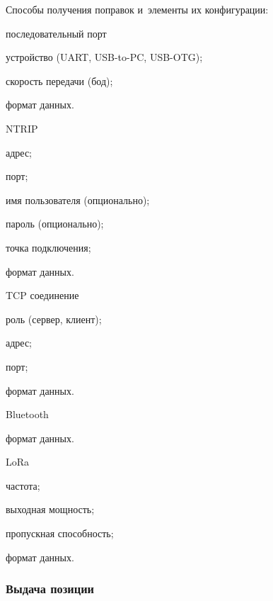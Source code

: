 Способы получения поправок и~элементы их конфигурации:
\begin{dashitemize}
  \item последовательный порт
  \begin{dashitemize}
    \item устройство (UART, USB-to-PC, USB-OTG);
    \item скорость передачи (бод);
    \item формат данных.
  \end{dashitemize}

  \item NTRIP
  \begin{dashitemize}
    \item адрес;
    \item порт;
    \item имя пользователя (опционально);
    \item пароль (опционально);
    \item точка подключения;
    \item формат данных.
  \end{dashitemize}

  \item TCP соединение
  \begin{dashitemize}
    \item роль (сервер, клиент);
    \item адрес;
    \item порт;
    \item формат данных.
  \end{dashitemize}

  \item Bluetooth
  \begin{dashitemize}
    \item формат данных.
  \end{dashitemize}

  \item LoRa
  \begin{dashitemize}
    \item частота;
    \item выходная мощность;
    \item пропускная способность;
    \item формат данных.
  \end{dashitemize}
\end{dashitemize}


\subsubsection{Выдача позиции}


